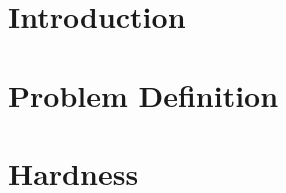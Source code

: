 \begin{abstract}
% 
\end{abstract}

\section{Introduction}
% 

\section{Problem Definition}


\section{Hardness}



